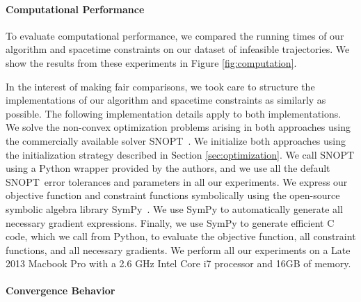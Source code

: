 \paragraph{Computational Performance}

To evaluate computational performance, we compared the running times of our algorithm and spacetime constraints on our dataset of infeasible trajectories.
We show the results from these experiments in Figure \ref{fig:computation}.

In the interest of making fair comparisons, we took care to structure the implementations of our algorithm and spacetime constraints as similarly as possible.
The following implementation details apply to both implementations.
We solve the non-convex optimization problems arising in both approaches using the commercially available solver SNOPT~\cite{gill:2002}.
We initialize both approaches using the initialization strategy described in Section \ref{sec:optimization}.
We call SNOPT using a Python wrapper provided by the authors, and we use all the default SNOPT\ error tolerances and parameters in all our experiments.
We express our objective function and constraint functions symbolically using the open-source symbolic algebra library SymPy~\cite{sympy:2014}.
We use SymPy to automatically generate all necessary gradient expressions. Finally, we use SymPy to generate efficient C code, which we call from Python, to evaluate the objective function, all constraint functions, and all necessary gradients.
We perform all our experiments on a Late 2013 Macbook Pro with a 2.6 GHz Intel Core i7 processor and 16GB of memory.

\paragraph{Convergence Behavior}

